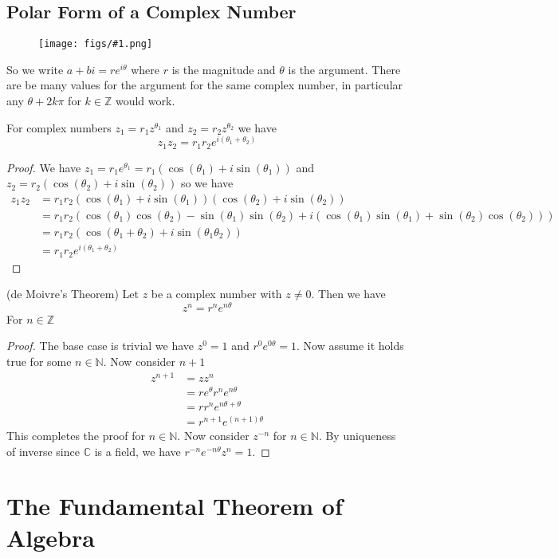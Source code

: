 \documentclass[16pt,a4paper]{article}
\theoremstyle{definition}
\newcommand{\Z}{\mathbb{Z}}
\newcommand{\C}{\mathbb{C}}
\newcommand{\fig}[2]{\begin{figure}[hbtp] 
 \centering
 \texttt{[image: figs/\#1.png]}
 \end{figure}
}
\begin{document}
\subsection{Polar Form of a Complex Number}
\fig{fig1}{1}

So we write $a+bi = re^{i\theta}$ where $r$ is the magnitude and $\theta$ is the argument. There are be many values for the argument for the same complex number, in particular any $\theta + 2k\pi$ for $k\in \mathbb{Z}$ would work. 

\begin{thm}{}{}
For complex numbers $z_1 = r_1z^{\theta_1}$ and $z_2 = r_2z^{\theta_2}$ we have 
\[
z_1z_2 = r_1r_2e^{i(\theta_1 + \theta_2)}
\] 
 \end{thm} 
\begin{proof}
We have $z_1 = r_1e^{\theta_1} = r_1(\cos(\theta_1) + i\sin(\theta_1))$ and 
$z_2 = r_2(\cos(\theta_2) + i\sin(\theta_2))$ so we have 
\begin{align*}
z_1z_2 &= r_1r_2(\cos(\theta_1) + i\sin(\theta_1))(\cos(\theta_2) + i\sin(\theta_2)) \\
&= r_1r_2(\cos(\theta_1)\cos(\theta_2) -\sin(\theta_1)\sin(\theta_2) + i(\cos(\theta_1)\sin(\theta_1)+\sin(\theta_2)\cos(\theta_2))) \\
&= r_1r_2(\cos(\theta_1 + \theta_2) + i\sin(\theta_1\theta_2))\\
&= r_1r_2e^{i(\theta_1+\theta_2)}
\end{align*}
\end{proof}

\begin{coll}{(de Moivre's Theorem)}{}
Let $z$ be a complex number with $z\neq 0$. Then we have 
\[
z^n = r^ne^{n\theta}
\]
For $n\in \Z$
\end{coll}
\begin{proof}
The base case is trivial we have $z^0 = 1$ and $r^0e^{0\theta} = 1$. Now assume it holds true for some $n\in \mathbb{N}$. Now consider $n+1$
\begin{align*}
z^{n+1} &= zz^{n} \\
&= re^{\theta}r^{n}e^{n\theta} \\
&= rr^ne^{n\theta + \theta}\\
&=  r^{n+1}e^{(n+1)\theta}
\end{align*}
This completes the proof for $n\in \mathbb{N}$. Now consider $z^{-n}$ for $n\in \mathbb{N}$. By uniqueness of inverse since $\C$ is a field, we have $r^{-n}e^{-n\theta}z^n = 1$. 
\end{proof}
\section{The Fundamental Theorem of Algebra}
\end{document}
